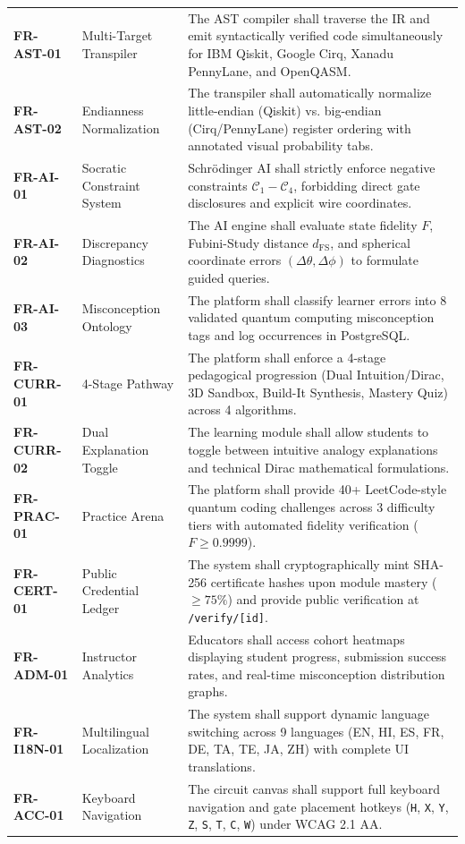 \documentclass[11pt, a4paper]{article}
\begin{document}
\begin{longtable}{@{}p{2.1cm}p{3.2cm}p{9.8cm}@{}}
\textbf{FR-AST-01} & Multi-Target Transpiler & The AST compiler shall traverse the IR and emit syntactically verified code simultaneously for IBM Qiskit, Google Cirq, Xanadu PennyLane, and OpenQASM. \\
\textbf{FR-AST-02} & Endianness Normalization & The transpiler shall automatically normalize little-endian (Qiskit) vs. big-endian (Cirq/PennyLane) register ordering with annotated visual probability tabs. \\
\textbf{FR-AI-01} & Socratic Constraint System & Schr{\"o}dinger AI shall strictly enforce negative constraints $\mathcal{C}_1-\mathcal{C}_4$, forbidding direct gate disclosures and explicit wire coordinates. \\
\textbf{FR-AI-02} & Discrepancy Diagnostics & The AI engine shall evaluate state fidelity $F$, Fubini-Study distance $d_{\text{FS}}$, and spherical coordinate errors $(\Delta\theta, \Delta\phi)$ to formulate guided queries. \\
\textbf{FR-AI-03} & Misconception Ontology & The platform shall classify learner errors into 8 validated quantum computing misconception tags and log occurrences in PostgreSQL. \\
\textbf{FR-CURR-01} & 4-Stage Pathway & The platform shall enforce a 4-stage pedagogical progression (Dual Intuition/Dirac, 3D Sandbox, Build-It Synthesis, Mastery Quiz) across 4 algorithms. \\
\textbf{FR-CURR-02} & Dual Explanation Toggle & The learning module shall allow students to toggle between intuitive analogy explanations and technical Dirac mathematical formulations. \\
\textbf{FR-PRAC-01} & Practice Arena & The platform shall provide 40+ LeetCode-style quantum coding challenges across 3 difficulty tiers with automated fidelity verification ($F \ge 0.9999$). \\
\textbf{FR-CERT-01} & Public Credential Ledger & The system shall cryptographically mint SHA-256 certificate hashes upon module mastery ($\ge 75\%$) and provide public verification at \texttt{/verify/[id]}. \\
\textbf{FR-ADM-01} & Instructor Analytics & Educators shall access cohort heatmaps displaying student progress, submission success rates, and real-time misconception distribution graphs. \\
\textbf{FR-I18N-01} & Multilingual Localization & The system shall support dynamic language switching across 9 languages (EN, HI, ES, FR, DE, TA, TE, JA, ZH) with complete UI translations. \\
\textbf{FR-ACC-01} & Keyboard Navigation & The circuit canvas shall support full keyboard navigation and gate placement hotkeys (\texttt{H}, \texttt{X}, \texttt{Y}, \texttt{Z}, \texttt{S}, \texttt{T}, \texttt{C}, \texttt{W}) under WCAG 2.1 AA. \\
\bottomrule
\end{longtable}
\endgroup
\end{document}
